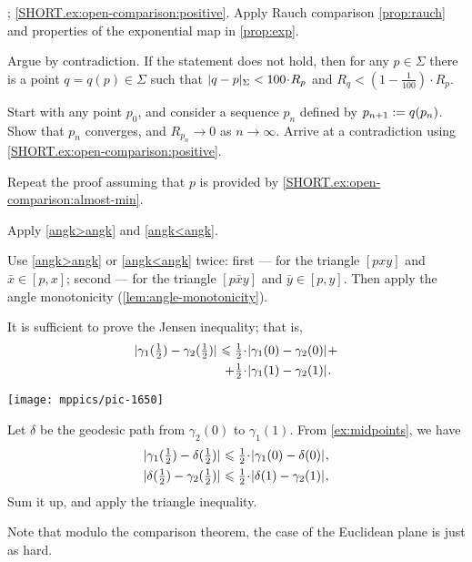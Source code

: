 \begin{multicols}{2}
\parbf{\ref{ex:open-comparison}}; \ref{SHORT.ex:open-comparison:positive}.
Apply Rauch comparison \ref{prop:rauch} and properties of the exponential map in \ref{prop:exp}.

 Argue by contradiction.
If the statement does not hold, then for any $p\in\Sigma$ there is a point $q=q(p)\in \Sigma$ such that 
$\dist{q}{p}\Sigma< 100\cdot R_p$
and
$R_q<(1-\tfrac1{100})\cdot R_p$.

Start with any point $p_0$, and consider a sequence $p_n$ defined by $p_{n+1}\z\df q(p_n)$.
Show that $p_n$ converges, and $R_{p_n}\to 0$ as $n\to\infty$.
Arrive at a contradiction using \ref{SHORT.ex:open-comparison:positive}.

 Repeat the proof assuming that $p$ is provided by \ref{SHORT.ex:open-comparison:almost-min}.

Apply \ref{angk>angk} and \ref{angk<angk}.

 Use \ref{angk>angk} or \ref{angk<angk} twice:
first --- for the triangle $[pxy]$ and $\bar x\in [p,x]$;
second --- for the triangle $[p\bar xy]$ and $\bar y\in [p,y]$.
Then apply the angle monotonicity (\ref{lem:angle-monotonicity}).

It is sufficient to prove the Jensen inequality;
that is, 
\begin{align*}
\dist{\gamma_1(\tfrac12)}{\gamma_2(\tfrac12)}{}
\le
\tfrac12\cdot&\dist{\gamma_1(0)}{\gamma_2(0)}{}
+
\\
+
\tfrac12\cdot&\dist{\gamma_1(1)}{\gamma_2(1)}{}.
\end{align*}

\begin{Figure}
\vskip-0mm
\centering
\texttt{[image: mppics/pic-1650]}
\vskip1mm
\end{Figure}

Let $\delta$ be the geodesic path from $\gamma_2(0)$ to $\gamma_1(1)$.
From \ref{ex:midpoints}, we have
\begin{align*}
\dist{\gamma_1(\tfrac12)}{\delta(\tfrac12)}{}
&\le
\tfrac12\cdot\dist{\gamma_1(0)}{\delta(0)}{},
\\
\dist{\delta(\tfrac12)}{\gamma_2(\tfrac12)}{}
&\le
\tfrac12\cdot\dist{\delta(1)}{\gamma_2(1)}{},
\end{align*}
Sum it up, and apply the triangle inequality.

 Note that modulo the comparison theorem, 
the case of the Euclidean plane is just as hard.


\end{multicols}
